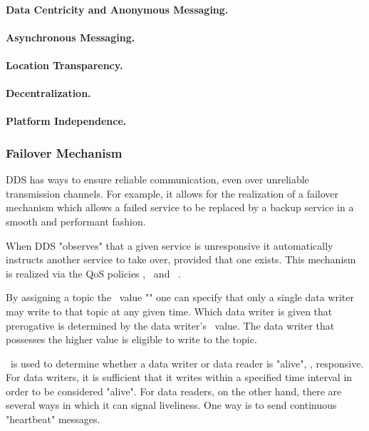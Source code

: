 \paragraph{Data Centricity and Anonymous Messaging.}

\paragraph{Asynchronous Messaging.}

\paragraph{Location Transparency.}

\paragraph{Decentralization.}

\paragraph{Platform Independence.}


\subsubsection{Failover Mechanism}

DDS has ways to ensure reliable communication, even over unreliable transmission channels. For example, it allows for the realization of a failover mechanism which allows a failed service to be replaced by a backup service in a smooth and performant fashion. 

When DDS "observes" that a given service is unresponsive it automatically instructs another service to take over, provided that one exists. This mechanism is realized via the QoS policies \ownership , \ostrength\ and \liveliness\ . 

By assigning a topic the \ownership\ value "" one can specify that only a single data writer may write to that topic at any given time. Which data writer is given that prerogative is determined by the data writer's \ostrength\ value. The data writer that possesses the higher value is eligible to write to the topic.

\liveliness\ is used to determine whether a data writer or data reader is "alive", \ie , responsive. For data writers, it is sufficient that it writes within a specified time interval in order to be considered "alive". For data readers, on the other hand, there are several ways in which it can signal liveliness. One way is to send continuous "heartbeat" messages.

